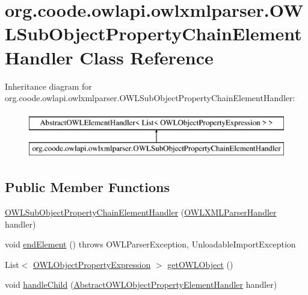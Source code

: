 \hypertarget{classorg_1_1coode_1_1owlapi_1_1owlxmlparser_1_1_o_w_l_sub_object_property_chain_element_handler}{\section{org.\-coode.\-owlapi.\-owlxmlparser.\-O\-W\-L\-Sub\-Object\-Property\-Chain\-Element\-Handler Class Reference}
\label{classorg_1_1coode_1_1owlapi_1_1owlxmlparser_1_1_o_w_l_sub_object_property_chain_element_handler}
}
Inheritance diagram for org.\-coode.\-owlapi.\-owlxmlparser.\-O\-W\-L\-Sub\-Object\-Property\-Chain\-Element\-Handler\-:\begin{figure}[H]
\begin{center}
\leavevmode
\includegraphics[height=2.000000cm]{classorg_1_1coode_1_1owlapi_1_1owlxmlparser_1_1_o_w_l_sub_object_property_chain_element_handler}
\end{center}
\end{figure}
\subsection*{Public Member Functions}
\begin{DoxyCompactItemize}
\item 
\hyperlink{classorg_1_1coode_1_1owlapi_1_1owlxmlparser_1_1_o_w_l_sub_object_property_chain_element_handler_a68155c6efaa9dfeea36e4ff738f3bf97}{O\-W\-L\-Sub\-Object\-Property\-Chain\-Element\-Handler} (\hyperlink{classorg_1_1coode_1_1owlapi_1_1owlxmlparser_1_1_o_w_l_x_m_l_parser_handler}{O\-W\-L\-X\-M\-L\-Parser\-Handler} handler)
\item 
void \hyperlink{classorg_1_1coode_1_1owlapi_1_1owlxmlparser_1_1_o_w_l_sub_object_property_chain_element_handler_ac027f9e8ffdbbbb3298e8a068c700f79}{end\-Element} ()  throws O\-W\-L\-Parser\-Exception, Unloadable\-Import\-Exception 
\item 
List$<$ \hyperlink{interfaceorg_1_1semanticweb_1_1owlapi_1_1model_1_1_o_w_l_object_property_expression}{O\-W\-L\-Object\-Property\-Expression} $>$ \hyperlink{classorg_1_1coode_1_1owlapi_1_1owlxmlparser_1_1_o_w_l_sub_object_property_chain_element_handler_a71078b63362e46c508a1d74b23623673}{get\-O\-W\-L\-Object} ()
\item 
void \hyperlink{classorg_1_1coode_1_1owlapi_1_1owlxmlparser_1_1_o_w_l_sub_object_property_chain_element_handler_a6f25c4fe696090bd60fa07c0a111ed07}{handle\-Child} (\hyperlink{classorg_1_1coode_1_1owlapi_1_1owlxmlparser_1_1_abstract_o_w_l_object_property_element_handler}{Abstract\-O\-W\-L\-Object\-Property\-Element\-Handler} handler)
\end{DoxyCompactItemize}
